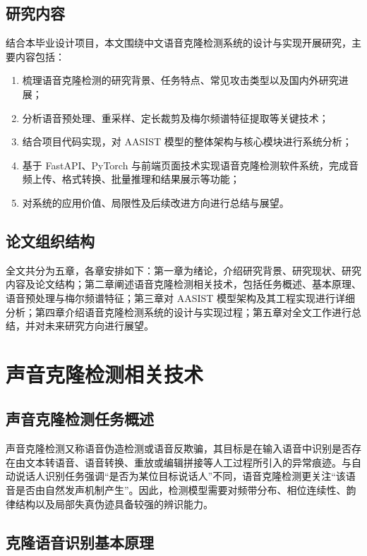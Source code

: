 \documentclass{xduugthesis}
\begin{document}
\section{研究内容}

结合本毕业设计项目，本文围绕中文语音克隆检测系统的设计与实现开展研究，主要内容包括：

\begin{enumerate}
    \item 梳理语音克隆检测的研究背景、任务特点、常见攻击类型以及国内外研究进展；
    \item 分析语音预处理、重采样、定长裁剪及梅尔频谱特征提取等关键技术；
    \item 结合项目代码实现，对 AASIST 模型的整体架构与核心模块进行系统分析；
    \item 基于 FastAPI、PyTorch 与前端页面技术实现语音克隆检测软件系统，完成音频上传、格式转换、批量推理和结果展示等功能；
    \item 对系统的应用价值、局限性及后续改进方向进行总结与展望。
\end{enumerate}

\section{论文组织结构}

全文共分为五章，各章安排如下：第一章为绪论，介绍研究背景、研究现状、研究内容及论文结构；第二章阐述语音克隆检测相关技术，包括任务概述、基本原理、语音预处理与梅尔频谱特征；第三章对 AASIST 模型架构及其工程实现进行详细分析；第四章介绍语音克隆检测系统的设计与实现过程；第五章对全文工作进行总结，并对未来研究方向进行展望。

\chapter{声音克隆检测相关技术}

\section{声音克隆检测任务概述}

声音克隆检测又称语音伪造检测或语音反欺骗，其目标是在输入语音中识别是否存在由文本转语音、语音转换、重放或编辑拼接等人工过程所引入的异常痕迹。与自动说话人识别任务强调“是否为某位目标说话人”不同，语音克隆检测更关注“该语音是否由自然发声机制产生”。因此，检测模型需要对频带分布、相位连续性、韵律结构以及局部失真伪迹具备较强的辨识能力。

\section{克隆语音识别基本原理}
\end{document}
